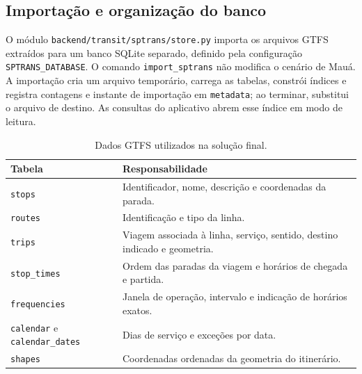 \documentclass[12pt,oneside,a4paper,brazil,chapter=TITLE]{abntex2}
\let\papsection\section
\renewcommand{\section}{\clearpage\papsection}
\begin{document}
\begin{apendicesenv}
\section{Importação e organização do banco}
O módulo \nolinkurl{backend/transit/sptrans/store.py} importa os arquivos GTFS extraídos para um banco SQLite separado, definido pela configuração \texttt{SPTRANS\_DATABASE}. O comando \texttt{import\_sptrans} não modifica o cenário de Mauá. A importação cria um arquivo temporário, carrega as tabelas, constrói índices e registra contagens e instante de importação em \texttt{metadata}; ao terminar, substitui o arquivo de destino. As consultas do aplicativo abrem esse índice em modo de leitura.

\begin{table}[H]\centering\small
\caption{Dados GTFS utilizados na solução final.}\label{tab:modelos-importacao}
\begin{tabular}{p{3.3cm}p{9.7cm}}\hline
Tabela & Responsabilidade\\\hline
\texttt{stops} & Identificador, nome, descrição e coordenadas da parada.\\
\texttt{routes} & Identificação e tipo da linha.\\
\texttt{trips} & Viagem associada à linha, serviço, sentido, destino indicado e geometria.\\
\texttt{stop\_times} & Ordem das paradas da viagem e horários de chegada e partida.\\
\texttt{frequencies} & Janela de operação, intervalo e indicação de horários exatos.\\
\texttt{calendar} e \texttt{calendar\_dates} & Dias de serviço e exceções por data.\\
\texttt{shapes} & Coordenadas ordenadas da geometria do itinerário.\\\hline
\end{tabular}
\end{table}


\end{apendicesenv}
\end{document}

